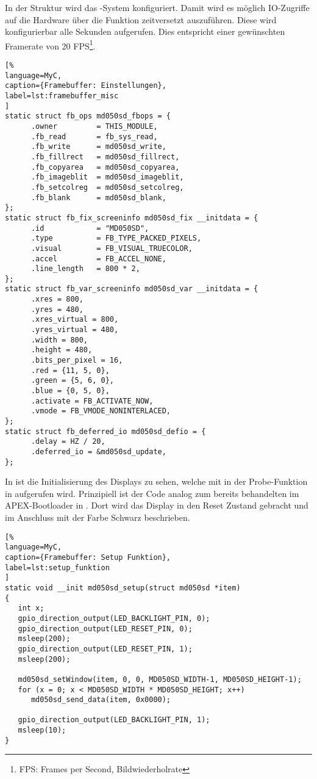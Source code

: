 In der Struktur  wird das -System konfiguriert. Damit wird es möglich IO-Zugriffe auf die Hardware über die Funktion  zeitversetzt auszuführen. Diese wird konfigurierbar alle  Sekunden aufgerufen. Dies entspricht einer gewünschten Framerate von 20 FPS\footnote{FPS: Frames per Second, Bildwiederholrate}. 
\begin{lstlisting}[%
language=MyC,
caption={Framebuffer: Einstellungen},
label=lst:framebuffer_misc
]
static struct fb_ops md050sd_fbops = {
      .owner         = THIS_MODULE,
      .fb_read       = fb_sys_read,
      .fb_write      = md050sd_write,
      .fb_fillrect   = md050sd_fillrect,
      .fb_copyarea   = md050sd_copyarea,
      .fb_imageblit  = md050sd_imageblit,
      .fb_setcolreg  = md050sd_setcolreg,
      .fb_blank      = md050sd_blank,
};
static struct fb_fix_screeninfo md050sd_fix __initdata = {
      .id            = "MD050SD",
      .type          = FB_TYPE_PACKED_PIXELS,
      .visual        = FB_VISUAL_TRUECOLOR,
      .accel         = FB_ACCEL_NONE,
      .line_length   = 800 * 2,
};
static struct fb_var_screeninfo md050sd_var __initdata = {
      .xres = 800,
      .yres = 480,
      .xres_virtual = 800,
      .yres_virtual = 480,
      .width = 800,
      .height = 480,
      .bits_per_pixel = 16,
      .red = {11, 5, 0},
      .green = {5, 6, 0},
      .blue = {0, 5, 0},
      .activate = FB_ACTIVATE_NOW,
      .vmode = FB_VMODE_NONINTERLACED,
};
static struct fb_deferred_io md050sd_defio = {
      .delay = HZ / 20,
      .deferred_io = &md050sd_update,
};
\end{lstlisting}

In  ist die Initialisierung des Displays zu sehen, welche mit  in der Probe-Funktion in  aufgerufen wird. Prinzipiell ist der Code analog zum bereits behandelten im APEX-Bootloader in . Dort wird das Display in den Reset Zustand gebracht und im Anschluss mit der Farbe Schwarz beschrieben.

\begin{lstlisting}[%
language=MyC,
caption={Framebuffer: Setup Funktion},
label=lst:setup_funktion
]
static void __init md050sd_setup(struct md050sd *item)
{
   int x;
   gpio_direction_output(LED_BACKLIGHT_PIN, 0);
   gpio_direction_output(LED_RESET_PIN, 0);
   msleep(200);
   gpio_direction_output(LED_RESET_PIN, 1);
   msleep(200);

   md050sd_setWindow(item, 0, 0, MD050SD_WIDTH-1, MD050SD_HEIGHT-1);
   for (x = 0; x < MD050SD_WIDTH * MD050SD_HEIGHT; x++)
      md050sd_send_data(item, 0x0000);

   gpio_direction_output(LED_BACKLIGHT_PIN, 1);
   msleep(10);
}
\end{lstlisting}

